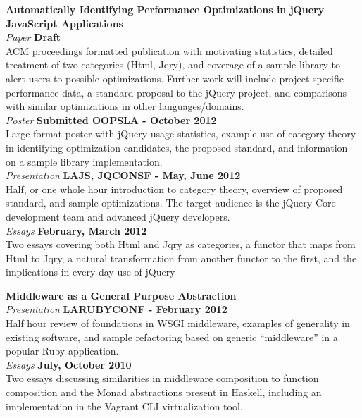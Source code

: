 \documentclass[margin,line]{resume}
\begin{document}
\begin{resume}
  \textbf{Automatically Identifying Performance Optimizations in jQuery JavaScript Applications}\vspace{2mm}\\
  \textsl{Paper} \hfill \textbf{Draft}\\
  ACM proceedings formatted publication with motivating statistics, detailed treatment of two categories (Html, Jqry), and coverage of a sample library to alert users to possible optimizations. Further work will include project specific performance data, a standard proposal to the jQuery project, and comparisons with similar optimizations in other languages/domains.\vspace{1mm}\\
  \textsl{Poster} \hfill \textbf{Submitted OOPSLA - October 2012}\\
  Large format poster with jQuery usage statistics, example use of category theory in identifying optimization candidates, the proposed standard, and information on a sample library implementation.\vspace{1mm}\\
  \textsl{Presentation} \hfill \textbf{LAJS, JQCONSF - May, June 2012}\\
  Half, or one whole hour introduction to category theory, overview of proposed standard, and sample optimizations. The target audience is the jQuery Core development team and advanced jQuery developers.
  \vspace{1mm}\\
  \textsl{Essays} \hfill \textbf{February, March 2012}\\
  Two essays covering both Html and Jqry as categories, a functor that maps from Html to Jqry, a natural transformation from another functor to the first, and the implications in every day use of jQuery

  \textbf{Middleware as a General Purpose Abstraction}\vspace{2mm}\\
  \textsl{Presentation} \hfill \textbf{LARUBYCONF - February 2012}\\
  Half hour review of foundations in WSGI middleware, examples of generality in existing software, and sample refactoring based on generic ``middleware'' in a popular Ruby application.
  \vspace{1mm}\\
  \textsl{Essays} \hfill \textbf{July, October 2010}\\
  Two essays discussing similarities in middleware composition to function composition and the Monad abstractions present in Haskell, including an implementation in the Vagrant CLI virtualization tool.\vspace{1mm}\\


\end{resume}
\end{document}
